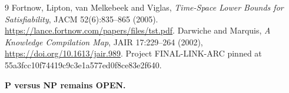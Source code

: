 \documentclass[11pt]{article}
\begin{document}
\begin{thebibliography}{9}
 Fortnow, Lipton, van Melkebeek and Viglas, \emph{Time-Space Lower Bounds for Satisfiability}, JACM 52(6):835--865 (2005). \url{https://lance.fortnow.com/papers/files/tst.pdf}.
 Darwiche and Marquis, \emph{A Knowledge Compilation Map}, JAIR 17:229--264 (2002), \url{https://doi.org/10.1613/jair.989}.
 Project FINAL-LINK-ARC pinned at 55a3fcc10f74419c9c3e1a577ed0f8ce83e2f640.
\end{thebibliography}
\noindent\textbf{P versus NP remains OPEN.}
\end{document}
